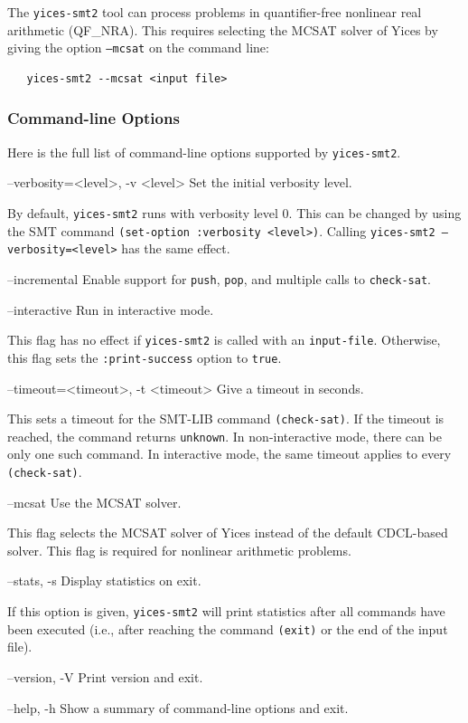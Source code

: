 \documentclass[11pt,twoside,fleqn,openright,titlepage]{cslreport}
\newenvironment{options}{
\begin{list}{}{
\setlength{\labelsep}{1.8ex}
\setlength{\labelwidth}{0pt}
\setlength{\itemindent}{-0.5\leftmargin}
\settowidth{\leftmargin}{\texttt{--}}
\renewcommand{\makelabel}{\optionlabel}}}
{\end{list}}
\newcommand*\optionlabel[1]{\hspace\labelsep\texttt{#1}}
\begin{document}
\medskip\noindent The \texttt{yices-smt2} tool can process problems in
quantifier-free nonlinear real arithmetic (QF\_NRA). This requires
selecting the MCSAT solver of Yices by giving the option
\texttt{--mcsat} on the command line:
\begin{small}
\begin{verbatim}
   yices-smt2 --mcsat <input file>
\end{verbatim}
\end{small}


\subsubsection*{Command-line Options}

Here is the full list of command-line options supported by
\texttt{yices-smt2}.
\begin{options}
\item[--verbosity=<level>, -v <level>] Set the initial verbosity level.

  By default, \texttt{yices-smt2} runs with verbosity level 0. This
  can be changed by using the SMT command \texttt{(set-option :verbosity <level>)}.
  Calling \texttt{yices-smt2 --verbosity=<level>} has the same effect.

\item[--incremental] Enable support for \texttt{push},
  \texttt{pop}, and multiple calls to \texttt{check-sat}.

\item[--interactive] Run in interactive mode.

   This flag has no effect if \texttt{yices-smt2} is called with an
   \texttt{input-file}. Otherwise, this flag sets the
   \texttt{:print-success} option to \texttt{true}.

\item[--timeout=<timeout>, -t <timeout>] Give a timeout in seconds.

  This sets a timeout for the SMT-LIB command \texttt{(check-sat)}. If
  the timeout is reached, the command returns \texttt{unknown}. In
  non-interactive mode, there can be only one such command. In
  interactive mode, the same timeout applies to every
  \texttt{(check-sat)}.

\item[--mcsat] Use the MCSAT solver.

   This flag selects the MCSAT solver of Yices instead of the default
   CDCL-based solver. This flag is required for nonlinear arithmetic
   problems.

\item[--stats, -s] Display statistics on exit.

  If this option is given, \texttt{yices-smt2} will print statistics
  after all commands have been executed (i.e., after reaching the
  command \texttt{(exit)} or the end of the input file).

\item[--version, -V] Print version and exit.

\item[--help, -h] Show a summary of command-line options and exit.

\end{options}
\end{document}
